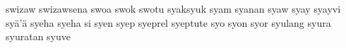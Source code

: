 \documentclass[a4paper]{article}
\begin{document}
swizaw\hspace{2mm}
swizawsena\hspace{2mm}
swoa\hspace{2mm}
swok\hspace{2mm}
swotu\hspace{2mm}
syaksyuk\hspace{2mm}
syam\hspace{2mm}
syanan\hspace{2mm}
syaw\hspace{2mm}
syay\hspace{2mm}
syayvi\hspace{2mm}
syä'ä\hspace{2mm}
syeha\hspace{2mm}
syeha si\hspace{2mm}
syen\hspace{2mm}
syep\hspace{2mm}
syeprel\hspace{2mm}
syeptute\hspace{2mm}
syo\hspace{2mm}
syon\hspace{2mm}
syor\hspace{2mm}
syulang\hspace{2mm}
syura\hspace{2mm}
syuratan\hspace{2mm}
syuve\hspace{2mm}
\end{document}

